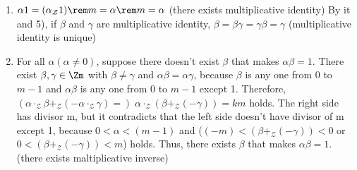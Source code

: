 \documentclass{article}
\newcommand\Z{\mathcal Z}
\begin{document}
\begin{enumerate}[label=(\alph*)]
\begin{enumerate}[label = \arabic*']
\begin{enumerate}[label=\arabic*)]
          \item\label{it:ex1.3.a.r.B3} $\alpha1 = (\alpha _\Z1)\rem m = \alpha \rem m = \alpha$ (there exists multiplicative identity)
            By it and 5), if $\beta$ and $\gamma$ are multiplicative identity, $\beta = \beta\gamma = \gamma\beta = \gamma$ (multiplicative identity is unique)
          \item For all $\alpha (\alpha \neq 0)$, suppose there doesn't exist $\beta$ that makes $\alpha\beta = 1$.
            There exist $\beta, \gamma \in \Zm$ with $\beta \neq \gamma$ and $\alpha\beta = \alpha\gamma$, because $\beta$ is any one from 0 to $m-1$ and $\alpha\beta$ is any one from 0 to $m-1$ except 1.
            Therefore, $(\alpha \cdot_\Z \beta +_\Z (- \alpha \cdot_\Z \gamma) =)\; \alpha \cdot_\Z (\beta +_\Z (-\gamma)) = km$ holds.
            The right side has divisor m, but it contradicts that the left side doesn't have divisor of m except 1,  because $0<\alpha<(m-1)$ and ($(-m)<(\beta +_\Z (-\gamma))<0$ or $0<(\beta +_\Z (-\gamma))<m$) holds.
            Thus, there exists $\beta$ that makes $\alpha\beta = 1$.(there exists maltiplicative inverse)
            

\end{enumerate}
\end{enumerate}
\end{enumerate}
\end{document}

